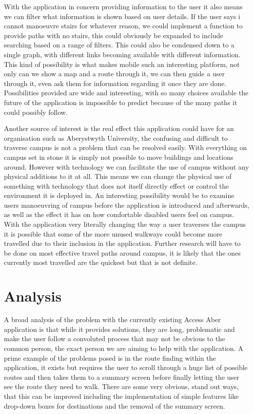 With the application in concern providing information to the user it also means we can filter what information is shown based on user details. If the user says i cannot manoeuvre stairs for whatever reason, we could implement a function to provide paths with no stairs, this could obviously be expanded to include searching based on a range of filters. This could also be condensed down to a single graph, with different links becoming available with different information. This kind of possibility is what makes mobile such an interesting platform, not only can we show a map and a route through it, we can then guide a user through it, even ask them for information regarding it once they are done. Possibilities provided are wide and interesting, with so many choices available the future of the application is impossible to predict because of the many paths it could possibly follow.

Another source of interest is the real effect this application could have for an organisation such as Aberystwyth University, the confusing and difficult to traverse campus is not a problem that can be resolved easily. With everything on campus set in stone it is simply not possible to move buildings and locations around. However with technology we can facilitate the use of campus without any physical additions to it at all. This means we can change the physical use of something with technology that does not itself directly effect or control the environment it is deployed in. An interesting possibility would be to examine users manoeuvring of campus before the application is introduced and afterwards, as well as the effect it has on how comfortable disabled users feel on campus. With the application very literally changing the way a user traverses the campus it is possible that some of the more unused walkways could become more travelled due to their inclusion in the application. Further research will have to be done on most effective travel paths around campus, it is likely that the ones currently most travelled are the quickest but that is not definite. 
\section{Analysis}
A broad analysis of the problem with the currently existing Access Aber\cite{aa} application is that while it provides solutions, they are long, problematic and make the user follow a convoluted process that may not be obvious to the common person, the exact person we are aiming to help with the application. A prime example of the problems posed is in the route finding within the application, it exists but requires the user to scroll through a huge list of possible routes and then takes them to a summary screen before finally letting the user see the route they need to walk. There are some very obvious, stand out ways, that this can be improved including the implementation of simple features like drop-down boxes for destinations and the removal of the summary screen. 

